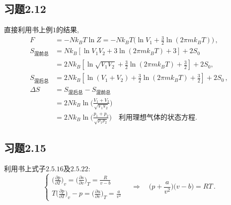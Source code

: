\documentclass[letterpaper, 10pt]{article}
\begin{document}
\subsection{习题2.12}
直接利用书上例$1$的结果,
\begin{align*}
F & = -Nk_{B}T \ln Z = -Nk_{B}T \big( \ln V_{1} + \frac{3}{2} \ln (2\pi m k_{B}T) \big) \,, \\
S_{\text{混前总}} & = Nk_{B} [ \ln V_1 V_2 + 3 \ln (2\pi m k_{B}T) + 3 ] + 2S_{0} \\
& = 2Nk_{B} [ \ln \sqrt{V_1 V_2} + \frac{3}{2} \ln (2\pi m k_{B}T) + \frac{3}{2} ] + 2S_{0}, \\
S_{\text{混后总}} & = 2Nk_{B} [ \ln (V_1+V_2) + \frac{3}{2} \ln (2\pi m k_{B}T) + \frac{3}{2}] + 2S_{0} \,, \\
\Delta S & = S_{\text{混后总}} - S_{\text{混前总}} \\
& = 2Nk_{B} \ln \Big( \frac{V_1 + V_2}{\sqrt{V_1 V_2}} \Big) \\
& = 2Nk_{B} \ln \Big( \frac{p_1 + p_2}{\sqrt{p_1 p_2}} \Big) \quad{} \text{利用理想气体的状态方程.}
\end{align*}

\subsection{习题2.15}
利用书上式子$2.5.16$及$2.5.22$:
\[ 
\begin{cases}
\big( \frac{\partial p}{\partial T} \big)_{v} = \big( \frac{\partial s}{\partial v} \big)_{T} = \frac{R}{v-b} \\
T \big( \frac{\partial p}{\partial T} \big)_{v} - p = \big( \frac{\partial u}{\partial v} \big)_{T} = \frac{a}{v^2}
\end{cases}
\quad{} \Rightarrow \quad{}
\big( p + \frac{a}{v^2} \big) \big( v - b \big) = RT \,.
\]
\end{document}
